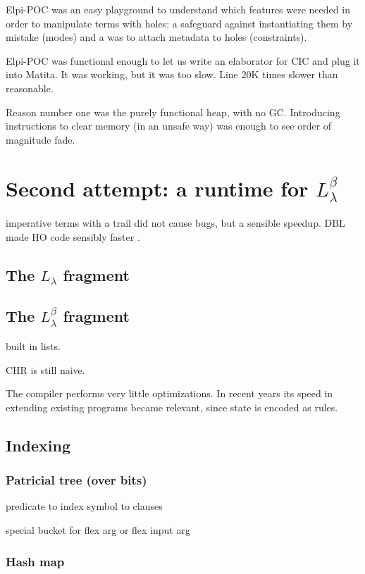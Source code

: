 \documentclass[a4paper, 11pt]{book}
\begin{document}
Elpi-POC was an easy playground to understand which features were needed in
order to manipulate terms with holes: a safeguard against instantiating them by
mistake (modes) and a was to attach metadata to holes (constraints).

Elpi-POC was functional enough to let us write an elaborator for CIC
and plug it into Matita. It was working, but it was too slow. Line 20K times
slower than reasonable.

Reason number one was the purely functional heap, with no GC. Introducing 
instructions to clear memory (in an unsafe way) was enough to see order of
magnitude fade.

\section{Second attempt: a runtime for $L_{\lambda}^{\beta}$}

imperative terms with a trail did not cause bugs, but a sensible speedup.
DBL made HO code sensibly faster \cite{dunchev15lpar}.

\subsection{The $L_{\lambda}$ fragment}
\subsection{The $L_{\lambda}^{\beta}$ fragment}

\cite{Michaylov1993HigherOrderLP}

built in lists.

CHR is still naive.

The compiler performs very little optimizations. In recent years its speed
in extending existing programs became relevant, since state is encoded as rules.

\subsection{Indexing}
\subsubsection{Patricial tree (over bits)}

predicate to index
symbol to clauses

special bucket for flex arg or flex input arg

\subsubsection{Hash map}
\end{document}
